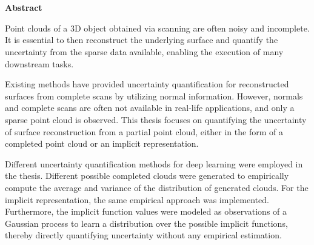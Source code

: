 \documentclass{thesis}
\begin{document}
\makeFrontMatter

\chapter*{}
\begin{center}
    \textbf{Abstract}\\
\end{center}
Point clouds of a 3D object obtained via scanning are often noisy and incomplete. It is essential to then reconstruct the underlying surface and quantify the uncertainty from the sparse data available, enabling the execution of many downstream tasks.

Existing methods have provided uncertainty quantification for reconstructed surfaces from complete scans by utilizing normal information. However, normals and complete scans are often not available in real-life applications, and only a sparse point cloud is observed. This thesis focuses on quantifying the uncertainty of surface reconstruction from a partial point cloud, either in the form of a completed point cloud or an implicit representation.

Different uncertainty quantification methods for deep learning were employed in the thesis. Different possible completed clouds were generated to empirically compute the average and variance of the distribution of generated clouds. For the implicit representation, the same empirical approach was implemented. Furthermore, the implicit function values were modeled as observations of a Gaussian process to learn a distribution over the possible implicit functions, thereby directly quantifying uncertainty without any empirical estimation.

\mainmatter













\begin{appendices}

\end{appendices}
\cleardoublepage

\backmatter
{}
{}
\begingroup
\setlength{\emergencystretch}{8em}
\printbibliography{}
\endgroup

\cleardoublepage
{}
{}
\printindex
\cleardoublepage
\end{document}
